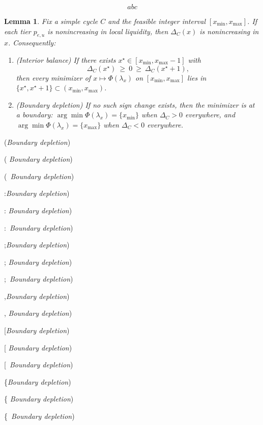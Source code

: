 \documentclass{amsart}
\newtheorem{lemma}{Lemma}
\begin{document}
\begin{equation}\label{eq}
  abc
\end{equation}

\begin{lemma}
\label{lem:cycle-optimality}
Fix a simple cycle $C$ and the feasible integer interval $[x_{\min},x_{\max}]$.
If each tier $p_{e,u}$ is nonincreasing in local liquidity, then $\Delta_C(x)$ is nonincreasing in $x$.
Consequently:
\begin{enumerate}
\item (\emph{Interior balance}) If there exists $x^\star\in[x_{\min},x_{\max}-1]$ with
\[
\Delta_C(x^\star)\ \ge\ 0\ \ge\ \Delta_C(x^\star\!+\!1),
\]
then every minimizer of $x\mapsto \Phi(\lambda_x)$ on $[x_{\min},x_{\max}]$ lies in $\{x^\star,x^\star\!+\!1\}\subset (x_{\min},x_{\max})$.
\item (\emph{Boundary depletion}) If no such sign change exists, then the minimizer is at a boundary:
$\arg\min \Phi(\lambda_x)=\{x_{\min}\}$ when $\Delta_C>0$ everywhere, and
$\arg\min \Phi(\lambda_x)=\{x_{\max}\}$ when $\Delta_C<0$ everywhere.
\end{enumerate}
\end{lemma}
{\it

  (\emph{Boundary depletion})

  ( \emph{Boundary depletion})

  (\ \emph{Boundary depletion})    

  :\emph{Boundary depletion})
  
  : \emph{Boundary depletion})

  :\ \emph{Boundary depletion})    

  ;\emph{Boundary depletion})

  ; \emph{Boundary depletion})

  ;\ \emph{Boundary depletion})    

  ,\emph{Boundary depletion})

  , \emph{Boundary depletion})

  [\emph{Boundary depletion})

  [ \emph{Boundary depletion})

    [\ \emph{Boundary depletion})

      \{\emph{Boundary depletion})

      \{ \emph{Boundary depletion})

  \{\ \emph{Boundary depletion})                  

    }
\end{document}
